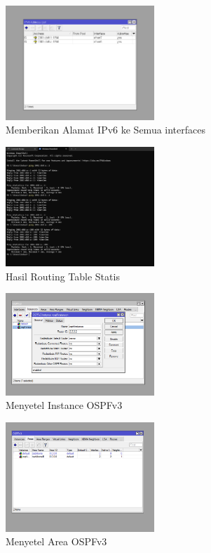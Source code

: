 \begin{figure}[H] 
    \centering
    \includegraphics[width=0.5\textwidth]{Dokum P2/Laptop 1/assign ip.png} 
    \caption{Memberikan Alamat IPv6 ke Semua interfaces} 
    \label{fig:langkaha2} 
\end{figure}
\begin{figure}[H] 
    \centering
    \includegraphics[width=0.5\textwidth]{Dokum P2/Laptop 2/ping laptop 1 ipv6.png} 
    \caption{Hasil Routing Table Statis} 
    \label{fig:langkaha5} 
\end{figure}
\begin{figure}[H] 
    \centering
    \includegraphics[width=0.5\textwidth]{Dokum P2/Laptop 2/jarkomp2-dinamis-instance-ospfv3.png} 
    \caption{Menyetel Instance OSPFv3} 
    \label{fig:langkahb2a} 
\end{figure}
\begin{figure}[H] 
    \centering
    \includegraphics[width=0.5\textwidth]{Dokum P2/Laptop 2/jarkomp2-dinamis-2.png} 
    \caption{Menyetel Area OSPFv3} 
    \label{fig:langkahb2b} 
\end{figure}
